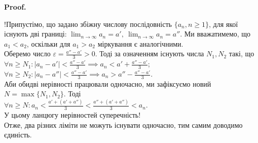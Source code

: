 \documentclass[a4paper, 14pt]{article}
\makeatletter
\def\qed{$\blacksquare$}
\theoremstyle{theoremdd}
\theoremstyle{theoremdd}
\theoremstyle{theoremdd}
\theoremstyle{theoremdd}
\theoremstyle{theoremdd}
\theoremstyle{theoremdd}
\theoremstyle{theoremdd}
\theoremstyle{theoremdd}
\renewenvironment{proof}[1][Proof.\\]{\par
\pushQED{\hfill \qed}%
\normalfont \topsep6\p@\@plus6\p@\relax
\trivlist
\item\relax
{\bfseries
#1\@addpunct{.}}\hspace\labelsep\ignorespaces
}{%
\popQED\endtrivlist\@endpefalse
}
\makeatother
\begin{document}
	\begin{proof}
	!Припустімо, що задано збіжну числову послідовність $\{a_n, n \geq 1\}$, для якої існують дві границі: $\displaystyle \lim_{n \to \infty} a_n = a', \ \lim_{n \to \infty} a_n = a''$. Ми вважатимемо, що $a_1 < a_2$, оскільки для $a_1 > a_2$ міркування є аналогічними.\\
	Оберемо число $\displaystyle \varepsilon = \frac{a''-a'}{3} > 0$. Тоді за означенням існують числа $N_1,N_2$ такі, що\\
	$\displaystyle\forall n \geq N_1: |a_n-a'|< \frac{a''-a'}{3} \implies a_n < a' + \frac{a''-a'}{3}$;\\
	$\displaystyle\forall n \geq N_2: |a_n-a''|< \frac{a''-a'}{3} \implies a_n > a'' - \frac{a''-a'}{3}$.\\
	Аби обидві нерівності працювали одночасно, ми зафіксуємо новий $N= \max\{N_1,N_2\}$. Тоді\\
	$\displaystyle \forall n \geq N: a_n < \frac{a'+(a'+a'')}{3} < \frac{a''+(a'+a'')}{3}<a_n$. \\
	У цьому ланцюгу нерівностей суперечність! \\ 
	Отже, два різних ліміти не можуть існувати одночасно, тим самим доводимо єдиність.
	\end{proof}
	
\end{document}

